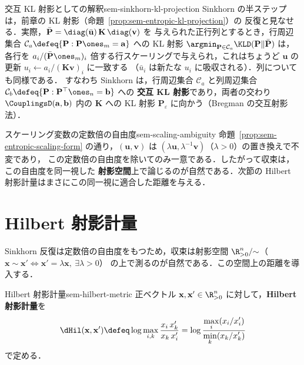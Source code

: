 \begin{remark}{交互 KL 射影としての解釈}{sem-sinkhorn-kl-projection}
  Sinkhorn の半ステップは，前章の KL 射影（命題~\ref{prop:sem-entropic-kl-projection}）の
  反復と見なせる．実際，$\bar{\mathbf{P}} = \diag(\bar{\mathbf{u}})\,\mathbf{K}\,\diag(\mathbf{v})$ を
  与えられた正行列とするとき，行周辺集合
  $\mathcal{C}_a \defeq \{\mathbf{P} : \mathbf{P}\ones_m = \mathbf{a}\}$ への KL 射影
  $\argmin_{\mathbf{P}\in\mathcal{C}_a}\KLD(\mathbf{P}\|\bar{\mathbf{P}})$ は，各行を
  $a_i / (\bar{\mathbf{P}}\ones_m)_i$ 倍する行スケーリングで与えられ，これはちょうど
  $\mathbf{u}$ の更新 $u_i \leftarrow a_i / (\mathbf{K}\mathbf{v})_i$ に一致する
  （$\bar{u}_i$ は新たな $u_i$ に吸収される）．列についても同様である．
  すなわち Sinkhorn は，行周辺集合 $\mathcal{C}_a$ と列周辺集合
  $\mathcal{C}_b \defeq \{\mathbf{P} : \mathbf{P}^\top\ones_n = \mathbf{b}\}$ への
  \textbf{交互 KL 射影}であり，両者の交わり $\CouplingsD(\mathbf{a}, \mathbf{b})$ 内の
  $\mathbf{K}$ への KL 射影 $\mathbf{P}_\varepsilon$ に向かう（Bregman の交互射影法）．
\end{remark}

\begin{remark}{スケーリング変数の定数倍の自由度}{sem-scaling-ambiguity}
  命題~\ref{prop:sem-entropic-scaling-form} の通り，$(\mathbf{u}, \mathbf{v})$ は
  $(\lambda\mathbf{u}, \lambda^{-1}\mathbf{v})$（$\lambda > 0$）の置き換えで不変であり，
  この定数倍の自由度を除いてのみ一意である．したがって収束は，この自由度を同一視した
  \textbf{射影空間}上で論じるのが自然である．次節の Hilbert 射影計量はまさにこの同一視に適合した距離を与える．
\end{remark}

\section{Hilbert 射影計量}
\label{sec:sem-hilbert-metric}

Sinkhorn 反復は定数倍の自由度をもつため，収束は射影空間
$\R_{>0}^n / {\sim}$（$\mathbf{x} \sim \mathbf{x}' \iff \mathbf{x}' = \lambda\mathbf{x},\ \exists\lambda>0$）
の上で測るのが自然である．この空間上の距離を導入する．

\begin{definition}{Hilbert 射影計量}{sem-hilbert-metric}
  正ベクトル $\mathbf{x}, \mathbf{x}' \in \R_{>0}^n$ に対して，\textbf{Hilbert 射影計量}を
  \[
    \dHil(\mathbf{x}, \mathbf{x}')
    \defeq
    \log \max_{i, k} \frac{x_i\, x'_k}{x_k\, x'_i}
    = \log \frac{\displaystyle\max_i (x_i / x'_i)}{\displaystyle\min_k (x_k / x'_k)}
  \]
  で定める．
\end{definition}

